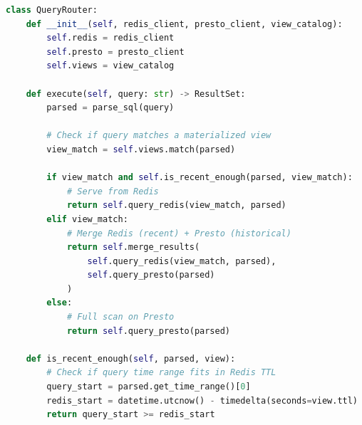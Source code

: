 \begin{lstlisting}[language=Python,caption=Query routing]
class QueryRouter:
    def __init__(self, redis_client, presto_client, view_catalog):
        self.redis = redis_client
        self.presto = presto_client
        self.views = view_catalog

    def execute(self, query: str) -> ResultSet:
        parsed = parse_sql(query)

        # Check if query matches a materialized view
        view_match = self.views.match(parsed)

        if view_match and self.is_recent_enough(parsed, view_match):
            # Serve from Redis
            return self.query_redis(view_match, parsed)
        elif view_match:
            # Merge Redis (recent) + Presto (historical)
            return self.merge_results(
                self.query_redis(view_match, parsed),
                self.query_presto(parsed)
            )
        else:
            # Full scan on Presto
            return self.query_presto(parsed)

    def is_recent_enough(self, parsed, view):
        # Check if query time range fits in Redis TTL
        query_start = parsed.get_time_range()[0]
        redis_start = datetime.utcnow() - timedelta(seconds=view.ttl)
        return query_start >= redis_start
\end{lstlisting}

